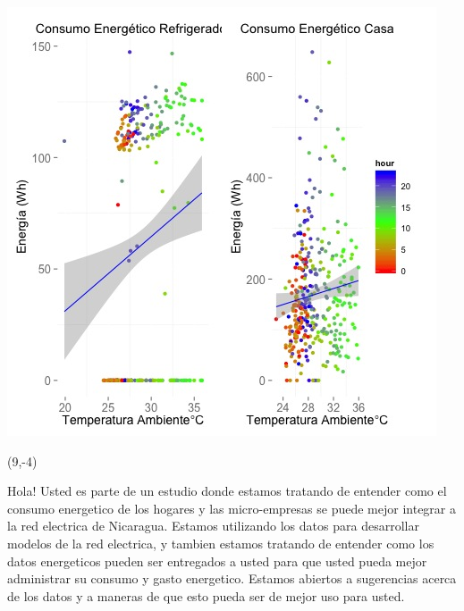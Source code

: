 \documentclass{article}\usepackage[]{graphicx}\usepackage[]{color}
\newenvironment{knitrout}{}{} %
\begin{document}
\begin{knitrout}
\color{fgcolor}
\includegraphics[scale=0.75]{figure/A3_correlaciones} 
\end{knitrout}

 \begin{textblock}{1}(9,-4)
\begin{minipage}{20em}
\begingroup

\endgroup
\end{minipage}
\end{textblock}

\vspace{70px}
\begin{knitrout}
Hola! Usted es parte de un estudio donde estamos tratando de entender como el consumo energetico de los hogares y las micro-empresas se puede mejor integrar a la red electrica de Nicaragua. Estamos utilizando los datos para desarrollar modelos de la red electrica, y tambien estamos tratando de entender como los datos energeticos pueden ser entregados a usted para que usted pueda mejor administrar su consumo y gasto energetico.  Estamos abiertos a sugerencias acerca de los datos y a maneras de que esto pueda ser de mejor uso para usted.
\end{knitrout}
\end{document}
